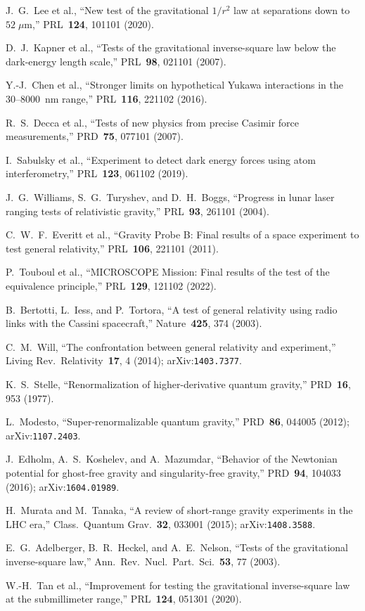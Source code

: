 \documentclass[11pt,a4paper]{article}
\begin{document}
\begin{enumerate}[label={[\arabic*]}, leftmargin=2em]
  \item J.~G.~Lee et al., ``New test of the gravitational $1/r^2$ law at
    separations down to $52\;\mu$m,'' PRL~\textbf{124}, 101101 (2020).
  \item D.~J.~Kapner et al., ``Tests of the gravitational inverse-square law
    below the dark-energy length scale,'' PRL~\textbf{98}, 021101 (2007).
  \item Y.-J.~Chen et al., ``Stronger limits on hypothetical Yukawa interactions
    in the 30--8000~nm range,'' PRL~\textbf{116}, 221102 (2016).
  \item R.~S.~Decca et al., ``Tests of new physics from precise Casimir force
    measurements,'' PRD~\textbf{75}, 077101 (2007).
  \item I.~Sabulsky et al., ``Experiment to detect dark energy forces using atom
    interferometry,'' PRL~\textbf{123}, 061102 (2019).
  \item J.~G.~Williams, S.~G.~Turyshev, and D.~H.~Boggs, ``Progress in lunar
    laser ranging tests of relativistic gravity,'' PRL~\textbf{93}, 261101 (2004).
  \item C.~W.~F.~Everitt et al., ``Gravity Probe B: Final results of a space
    experiment to test general relativity,'' PRL~\textbf{106}, 221101 (2011).
  \item P.~Touboul et al., ``MICROSCOPE Mission: Final results of the test of
    the equivalence principle,'' PRL~\textbf{129}, 121102 (2022).
  \item B.~Bertotti, L.~Iess, and P.~Tortora, ``A test of general relativity
    using radio links with the Cassini spacecraft,''
    Nature~\textbf{425}, 374 (2003).
  \item C.~M.~Will, ``The confrontation between general relativity and
    experiment,'' Living Rev.\ Relativity~\textbf{17}, 4 (2014);
    arXiv:\texttt{1403.7377}.
  \item K.~S.~Stelle, ``Renormalization of higher-derivative quantum gravity,''
    PRD~\textbf{16}, 953 (1977).
  \item L.~Modesto, ``Super-renormalizable quantum gravity,''
    PRD~\textbf{86}, 044005 (2012); arXiv:\texttt{1107.2403}.
  \item J.~Edholm, A.~S.~Koshelev, and A.~Mazumdar, ``Behavior of the Newtonian
    potential for ghost-free gravity and singularity-free gravity,''
    PRD~\textbf{94}, 104033 (2016); arXiv:\texttt{1604.01989}.
  \item H.~Murata and M.~Tanaka, ``A review of short-range gravity experiments
    in the LHC era,'' Class.\ Quantum Grav.~\textbf{32}, 033001 (2015);
    arXiv:\texttt{1408.3588}.
  \item E.~G.~Adelberger, B.~R.~Heckel, and A.~E.~Nelson, ``Tests of the
    gravitational inverse-square law,'' Ann.\ Rev.\ Nucl.\ Part.\
    Sci.~\textbf{53}, 77 (2003).
  \item W.-H.~Tan et al., ``Improvement for testing the gravitational
    inverse-square law at the submillimeter range,''
    PRL~\textbf{124}, 051301 (2020).
\end{enumerate}
\end{document}
